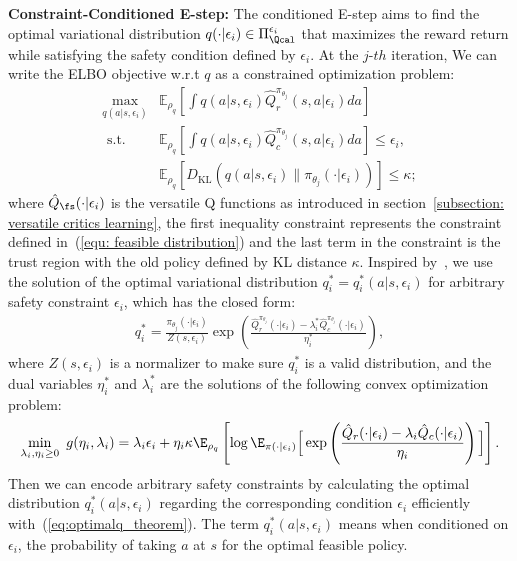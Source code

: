 \textbf{Constraint-Conditioned E-step: }The conditioned E-step aims to find the optimal variational distribution $q(\cdot | \epsilon_i) \in \Pi_{\Qcal}^{\epsilon_i}$ that maximizes the reward return while satisfying the safety condition defined by $\epsilon_i$.
At the $j$-$th$ iteration, We can write the ELBO objective w.r.t $q$ as a constrained optimization problem:
\begin{equation}
\label{eq:estep_objective}
\begin{aligned}
 \max _{q\left(a | s, \epsilon_i\right)}  & \mathbb{E}_{\rho_q}\left[\int q\left(a | s, \epsilon_i\right) \hat{Q}_r^{\pi_{\theta_j}}\left(s, a | \epsilon_i\right) d a\right] \\
 \text { s.t. } & \mathbb{E}_{\rho_q}\left[\int q\left(a | s, \epsilon_i\right) \hat{Q}_c^{\pi_{\theta_j}}\left(s, a | \epsilon_i\right) d a\right] \leq \epsilon_i, \\
& \mathbb{E}_{\rho_q}\left[D_{\mathrm{KL}}\left(q\left(a | s, \epsilon_i\right) \| \pi_{\theta_j}\left(\cdot | \epsilon_i\right)\right)\right] \leq \kappa;
\end{aligned}
\end{equation}
where $\hat{Q}_\fs(\cdot | \epsilon_i)$ is the versatile Q functions as introduced in section~\ref{subsection: versatile critics learning}, the first inequality constraint represents the constraint defined in~(\ref{equ: feasible distribution}) and the last term in the constraint is the trust region with the old policy defined by KL distance $\kappa$. Inspired by~\cite{abdolmaleki2018maximum}, we use the solution of the optimal variational distribution $q^*_i = q^*_i(a|s, \epsilon_i)$ for arbitrary safety constraint $\epsilon_i$, which has the closed form:
 \begin{align}
    q^*_i = \frac{\pi_{\theta_j}(\cdot | \epsilon_i)}{Z(s, \epsilon_i)} \exp\left(\frac{\hat{Q}_r^{\pi_{\theta_j}}(\cdot | \epsilon_i) - \lambda_i^* \hat{Q}_c^{\pi_{\theta_j}}(\cdot | \epsilon_i)}{\eta_i^*}\right),
    \label{eq:optimalq_theorem}
\end{align}
where $Z(s, \epsilon_i)$ is a normalizer to make sure $q_i^*$ is a valid distribution, and the dual variables $\eta_i^*$ and $\lambda_i^*$ are the solutions of the following convex optimization problem:
\begin{equation}
 \begin{aligned}
      \min_{\lambda_i, \eta_i \geq 0} \ g(\eta_i, \lambda_i) = \lambda_i \epsilon_i + \eta_i \kappa \E_{\rho_q} \left[ \log \E_{\pi(\cdot |{\epsilon_i})} \Big[ \exp\left(\frac{\hat{Q}_r( \cdot | \epsilon_i)- \lambda_i \hat{Q}_c( \cdot | \epsilon_i)}{\eta_i}\right) \Big] \right].
\end{aligned}
\label{eq:dual_opt}
\end{equation}
Then we can encode arbitrary safety constraints by calculating the optimal distribution $q^*_i(a|s, \epsilon_i)$ regarding the corresponding condition $\epsilon_i$ efficiently with~(\ref{eq:optimalq_theorem}). The term $q^*_i(a|s, \epsilon_i)$ means when conditioned on $\epsilon_i$, the probability of taking $a$ at $s$ for the optimal feasible policy.

